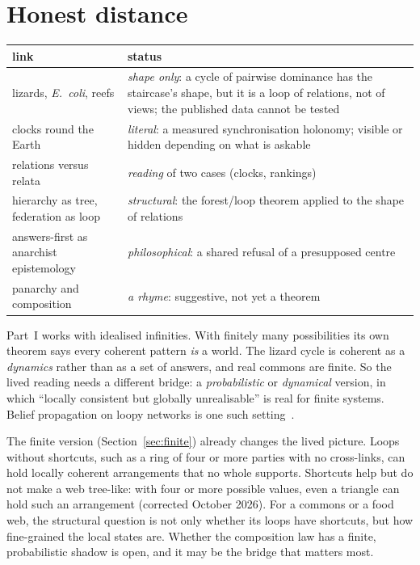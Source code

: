\documentclass[11pt]{article}
\begin{document}
\section{Honest distance}\label{sec:distance}
\begin{center}\small
\begin{tabular}{|>{\raggedright\arraybackslash}p{4.2cm}|>{\raggedright\arraybackslash}p{9.2cm}|}
\hline
\textbf{link} & \textbf{status}\\\hline
lizards, \emph{E.\ coli}, reefs & \emph{shape only}: a cycle of pairwise dominance has the staircase's shape, but it is a loop of relations, not of views; the published data cannot be tested\\\hline
clocks round the Earth & \emph{literal}: a measured synchronisation holonomy; visible or hidden depending on what is askable\\\hline
relations versus relata & \emph{reading} of two cases (clocks, rankings)\\\hline
hierarchy as tree, federation as loop & \emph{structural}: the forest/loop theorem applied to the shape of relations\\\hline
answers-first as anarchist epistemology & \emph{philosophical}: a shared refusal of a presupposed centre\\\hline
panarchy and composition & \emph{a rhyme}: suggestive, not yet a theorem\\\hline
\end{tabular}
\end{center}
Part~I works with idealised infinities. With finitely many possibilities its own
theorem says every coherent pattern \emph{is} a world. The lizard cycle is
coherent as a \emph{dynamics} rather than as a set of answers, and real commons
are finite. So the lived reading needs a different bridge: a
\emph{probabilistic} or \emph{dynamical} version, in which ``locally consistent
but globally unrealisable'' is real for finite systems. Belief propagation on
loopy networks is one such setting~\cite{wainwrightjordan2008}.

The finite version (Section~\ref{sec:finite}) already changes the lived picture.
Loops without shortcuts, such as a ring of four or more parties with no
cross-links, can hold locally coherent arrangements that no whole supports.
Shortcuts help but do not make a web tree-like: with four or more possible
values, even a triangle can hold such an arrangement (corrected October 2026).
For a commons or a food web, the structural question is not only whether its
loops have shortcuts, but how fine-grained the local states are. Whether the composition law has a
finite, probabilistic shadow is open, and it may be the bridge that matters
most.
\end{document}
